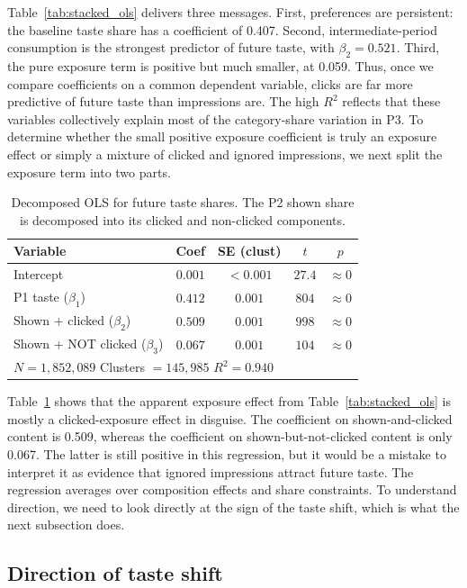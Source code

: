 \documentclass[11pt]{article}
\begin{document}
Table~\ref{tab:stacked_ols} delivers three messages. First, preferences are persistent: the baseline taste share has a coefficient of 0.407. Second, intermediate-period consumption is the strongest predictor of future taste, with $\beta_2 = 0.521$. Third, the pure exposure term is positive but much smaller, at 0.059. Thus, once we compare coefficients on a common dependent variable, clicks are far more predictive of future taste than impressions are. The high $R^2$ reflects that these variables collectively explain most of the category-share variation in P3. To determine whether the small positive exposure coefficient is truly an exposure effect or simply a mixture of clicked and ignored impressions, we next split the exposure term into two parts.
\begin{table}[ht]
\centering
\caption{Decomposed OLS for future taste shares. The P2 shown share is decomposed into its clicked and non-clicked components.}
\label{tab:decomposed_ols}
\begin{tabular}{lcccc}
\toprule
Variable & Coef & SE (clust) & $t$ & $p$ \\
\midrule
Intercept & $0.001$ & $<0.001$ & $27.4$ & $\approx 0$ \\
P1 taste ($\beta_1$) & $0.412$ & $0.001$ & $804$ & $\approx 0$ \\
Shown + clicked ($\beta_2$) & $\mathbf{0.509}$ & $0.001$ & $998$ & $\approx 0$ \\
Shown + NOT clicked ($\beta_3$) & $\mathbf{0.067}$ & $0.001$ & $104$ & $\approx 0$ \\
\midrule
\multicolumn{5}{l}{$N = 1{,}852{,}089$ \quad Clusters $= 145{,}985$ \quad $R^2 = 0.940$} \\
\bottomrule
\end{tabular}
\end{table}
\FloatBarrier

Table~\ref{tab:decomposed_ols} shows that the apparent exposure effect from Table~\ref{tab:stacked_ols} is mostly a clicked-exposure effect in disguise. The coefficient on shown-and-clicked content is 0.509, whereas the coefficient on shown-but-not-clicked content is only 0.067. The latter is still positive in this regression, but it would be a mistake to interpret it as evidence that ignored impressions attract future taste. The regression averages over composition effects and share constraints. To understand direction, we need to look directly at the sign of the taste shift, which is what the next subsection does.
\subsection{Direction of taste shift}
\end{document}
